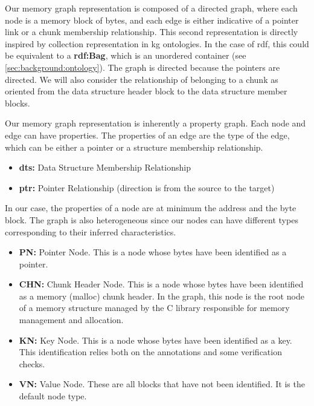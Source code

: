 Our memory graph representation is composed of a directed graph, where each node is a memory block of bytes, and each edge is either indicative of a pointer link or a chunk membership relationship. This second representation is directly inspired by collection representation in \acrlong{kg} ontologies. In the case of \acrshort{rdf}, this could be equivalent to a \textbf{rdf:Bag}, which is an unordered container \cite{OrderedDataInRDF20} (see \ref{sec:background:ontology}). The graph is directed because the pointers are directed. We will also consider the relationship of belonging to a chunk as oriented from the data structure header block to the data structure member blocks.

Our memory graph representation is inherently a property graph. Each node and edge can have properties. The properties of an edge are the type of the edge, which can be either a pointer or a structure membership relationship.

\begin{itemize}
    \item \textbf{dts:} Data Structure Membership Relationship
    \item \textbf{ptr:} Pointer Relationship (direction is from the source to the target)
\end{itemize}

In our case, the properties of a node are at minimum the address and the byte block. The graph is also heterogeneous since our nodes can have different types corresponding to their inferred characteristics. 

\begin{itemize}
    \item \textbf{PN:} Pointer Node. This is a node whose bytes have been identified as a pointer.
    \item \textbf{CHN:} Chunk Header Node. This is a node whose bytes have been identified as a memory (malloc) chunk header. In the graph, this node is the root node of a memory structure managed by the C library responsible for memory management and allocation.
    \item \textbf{KN:} Key Node. This is a node whose bytes have been identified as a key. This identification relies both on the annotations and some verification checks.
    \item \textbf{VN:} Value Node. These are all blocks that have not been identified. It is the default node type.
\end{itemize}

